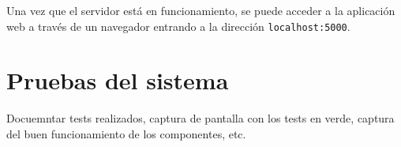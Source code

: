 Una vez que el servidor está en funcionamiento, se puede acceder a la aplicación web a través de un navegador entrando a la dirección \texttt{localhost:5000}.

\section{Pruebas del sistema}

Docuemntar tests realizados, captura de pantalla con los tests en verde, captura del buen funcionamiento de los componentes, etc.
